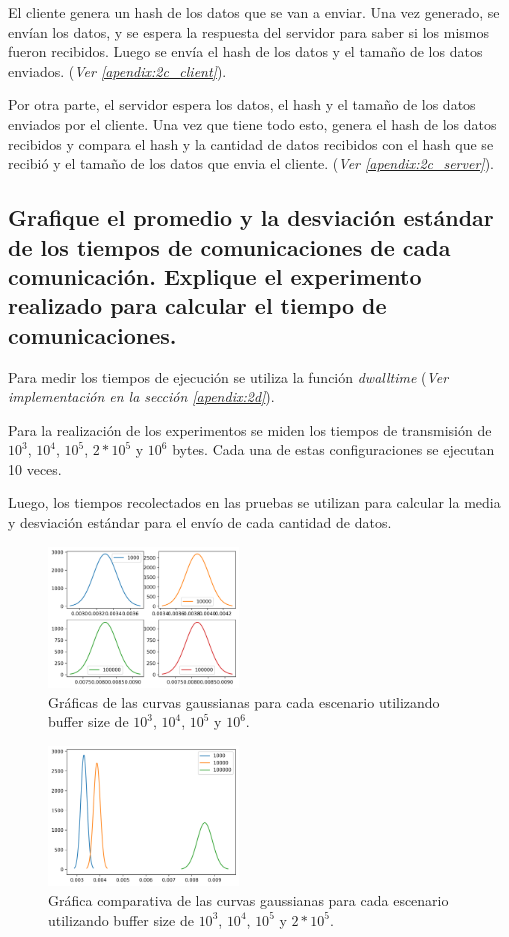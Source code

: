 \documentclass[osajnl,twocolumn,showpacs,superscriptaddress,10pt]{revtex4-1} %
\begin{document}
El cliente genera un hash de los datos que se van a enviar. Una vez generado, se envían los datos, y se espera la respuesta del servidor para saber si los mismos fueron recibidos. Luego se envía el hash de los datos y el tamaño de los datos enviados. (\textit{Ver \ref{apendix:2c_client}}).

Por otra parte, el servidor espera los datos, el hash y el tamaño de los datos enviados por el cliente. Una vez que tiene todo esto, genera el hash de los datos recibidos y compara el hash y la cantidad de datos recibidos con el hash que se recibió y el tamaño de los datos que envia el cliente. (\textit{Ver \ref{apendix:2c_server}}).

\subsection{Grafique el promedio y la desviación estándar de los tiempos de comunicaciones de cada comunicación. Explique el experimento realizado para calcular el tiempo de comunicaciones.}

Para medir los tiempos de ejecución se utiliza la función \textit{dwalltime} (\textit{Ver implementación en la sección \ref{apendix:2d}}).

Para la realización de los experimentos se miden los tiempos de transmisión de $10^3$, $10^4$, $10^5$, $2*10^5$ y $10^6$ bytes. Cada una de estas configuraciones se ejecutan 10 veces.

Luego, los tiempos recolectados en las pruebas se utilizan para calcular la media y desviación estándar para el envío de cada cantidad de datos.

\begin{figure}[H]
    \centering
    \includegraphics[width=0.45\textwidth]{graph_multi}
    \caption{Gráficas de las curvas gaussianas para cada escenario utilizando buffer size de $10^3$, $10^4$, $10^5$ y $10^6$.}
    \label{figure:summary_flatten}
\end{figure}

\begin{figure}[H]
    \centering
    \includegraphics[width=0.45\textwidth]{graph}
    \caption{Gráfica comparativa de las curvas gaussianas para cada escenario utilizando buffer size de $10^3$, $10^4$, $10^5$ y $2*10^5$.}
    \label{figure:summary}
\end{figure}
\end{document}

